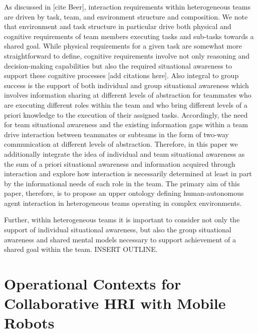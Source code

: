 \documentclass[letterpaper, 10 pt, conference]{ieeeconf}  %
\theoremstyle{definition}
\begin{document}
As discussed in [cite Beer], interaction requirements within heterogeneous teams are driven by task, team, and environment structure and composition. We note that environment and task structure in particular drive both physical and cognitive requirements of team members executing tasks and sub-tasks towards a shared goal. While physical requirements for a given task are somewhat more straightforward to define, cognitive requirements involve not only reasoning and decision-making capabilities but also the required situational awareness to support these cognitive processes [add citations here]. Also integral to group success is the support of both individual and group situational awareness which involves information sharing at different levels of abstraction for teammates who are executing different roles within the team and who bring different levels of a priori knowledge to the execution of their assigned tasks. Accordingly, the need for team situational awareness and the existing information gaps within a team drive interaction between teammates or subteams in the form of two-way communication at different levels of abstraction.  Therefore, in this paper we additionally integrate the idea of individual and team situational awareness as the sum of a priori situational awareness and information acquired through interaction and explore how interaction is necessarily determined at least in part by the informational needs of each role in the team. The primary aim of this paper, therefore, is to propose an upper ontology defining human-autonomous agent interaction in heterogeneous teams operating in complex environments. 

 Further, within heterogeneous teams it is important to consider not only the support of individual situational awareness, but also the group situational awareness and shared mental models necessary to support achievement of a shared goal within the team. INSERT OUTLINE.

 


\section{Operational Contexts for Collaborative HRI with Mobile Robots}
\label{sec:op-context}
\end{document}

